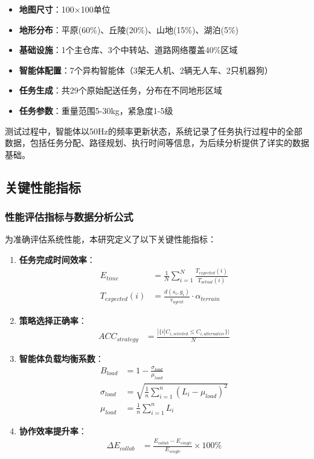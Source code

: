 \documentclass[12pt,a4paper]{article}
\begin{document}
\begin{itemize}
    \item \textbf{地图尺寸}：100×100单位
    \item \textbf{地形分布}：平原(60\%)、丘陵(20\%)、山地(15\%)、湖泊(5\%)
    \item \textbf{基础设施}：1个主仓库、3个中转站、道路网络覆盖40\%区域
    \item \textbf{智能体配置}：7个异构智能体（3架无人机、2辆无人车、2只机器狗）
    \item \textbf{任务生成}：共29个原始配送任务，分布在不同地形区域
    \item \textbf{任务参数}：重量范围5-30kg，紧急度1-5级
\end{itemize}

测试过程中，智能体以50Hz的频率更新状态，系统记录了任务执行过程中的全部数据，包括任务分配、路径规划、执行时间等信息，为后续分析提供了详实的数据基础。

\subsection{关键性能指标}

\subsubsection{性能评估指标与数据分析公式}

为准确评估系统性能，本研究定义了以下关键性能指标：

\begin{enumerate}
    \item \textbf{任务完成时间效率}：
    \begin{align}
    E_{time} &= \frac{1}{N} \sum_{i=1}^{N} \frac{T_{expected}(i)}{T_{actual}(i)} \\
    T_{expected}(i) &= \frac{d(s_i, g_i)}{v_{agent}} \cdot \alpha_{terrain}
    \end{align}
    
    \item \textbf{策略选择正确率}：
    \begin{align}
    ACC_{strategy} &= \frac{|\{i | C_{i,selected} \leq C_{i,alternative}\}|}{N}
    \end{align}
    
    \item \textbf{智能体负载均衡系数}：
    \begin{align}
    B_{load} &= 1 - \frac{\sigma_{load}}{\mu_{load}} \\
    \sigma_{load} &= \sqrt{\frac{1}{n} \sum_{i=1}^{n} (L_i - \mu_{load})^2} \\
    \mu_{load} &= \frac{1}{n} \sum_{i=1}^{n} L_i
    \end{align}
    
    \item \textbf{协作效率提升率}：
    \begin{align}
    \Delta E_{collab} &= \frac{E_{collab} - E_{single}}{E_{single}} \times 100\%
    \end{align}
\end{enumerate}
\end{document}
